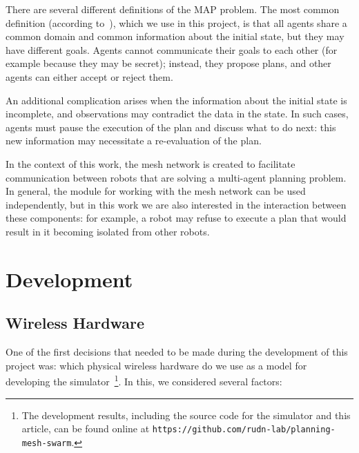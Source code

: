 \documentclass[%
]{article}
\begin{document}
There are several different definitions of the MAP problem.
The most common definition (according to~\cite{doi:10.3233/MGS-2009-0133}), which we use in this project,
is that all agents share a common domain and common information about the initial state,
but they may have different goals.
Agents cannot communicate their goals to each other (for example because they may be secret);
instead, they propose plans, and other agents can either accept or reject them.

An additional complication arises when the information about the initial state is incomplete,
and observations may contradict the data in the state.
In such cases, agents must pause the execution of the plan and discuss what to do next:
this new information may necessitate a re-evaluation of the plan.

In the context of this work, the mesh network is created to facilitate communication between robots
that are solving a multi-agent planning problem.
In general, the module for working with the mesh network can be used independently,
but in this work we are also interested in the interaction between these components:
for example, a robot may refuse to execute a plan that would result in it becoming isolated from other robots.

\section{Development} 
\label{sec:base-section}

\subsection{Wireless Hardware}

One of the first decisions that needed to be made during the development of this project was:
which physical wireless hardware do we use as a model for developing the simulator~\footnote{The development results, including the source code for the simulator and this article, can be found online at \texttt{https://github.com/rudn-lab/planning-mesh-swarm}.}.
In this, we considered several factors:
\end{document}
